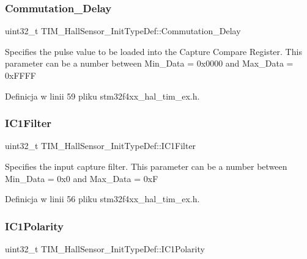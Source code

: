 \subsubsection{\texorpdfstring{Commutation\+\_\+\+Delay}{Commutation\_Delay}}
{\footnotesize\ttfamily uint32\+\_\+t T\+I\+M\+\_\+\+Hall\+Sensor\+\_\+\+Init\+Type\+Def\+::\+Commutation\+\_\+\+Delay}

Specifies the pulse value to be loaded into the Capture Compare Register. This parameter can be a number between Min\+\_\+\+Data = 0x0000 and Max\+\_\+\+Data = 0x\+F\+F\+FF 

Definicja w linii 59 pliku stm32f4xx\+\_\+hal\+\_\+tim\+\_\+ex.\+h.

\mbox{\label{struct_t_i_m___hall_sensor___init_type_def_a2d349ca17282be59dd09dc9b10948d24}} 
\subsubsection{\texorpdfstring{I\+C1\+Filter}{IC1Filter}}
{\footnotesize\ttfamily uint32\+\_\+t T\+I\+M\+\_\+\+Hall\+Sensor\+\_\+\+Init\+Type\+Def\+::\+I\+C1\+Filter}

Specifies the input capture filter. This parameter can be a number between Min\+\_\+\+Data = 0x0 and Max\+\_\+\+Data = 0xF 

Definicja w linii 56 pliku stm32f4xx\+\_\+hal\+\_\+tim\+\_\+ex.\+h.

\mbox{\label{struct_t_i_m___hall_sensor___init_type_def_a08e8f098cb51159344135bab57d82d85}} 
\subsubsection{\texorpdfstring{I\+C1\+Polarity}{IC1Polarity}}
{\footnotesize\ttfamily uint32\+\_\+t T\+I\+M\+\_\+\+Hall\+Sensor\+\_\+\+Init\+Type\+Def\+::\+I\+C1\+Polarity}

